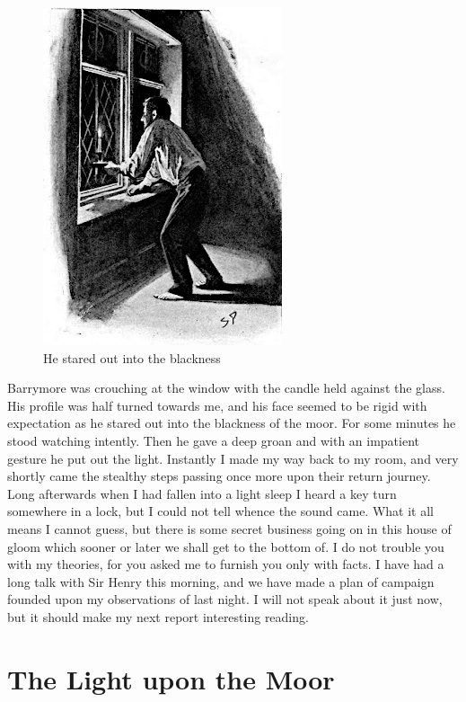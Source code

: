 \documentclass[paper=5.5in:8.5in,BCOR=7mm,twoside,DIV=calc,12pt,usegeometry,openany,chapterprefix,endperiod]{scrbook} %
\begin{document}
\begin{figure}
\centering
\includegraphics[width=.7\linewidth]{08_candle}
\caption{He stared out into the blackness}
\end{figure}


Barrymore was crouching at the window with the candle held against the glass. His profile was half turned towards me, and his face seemed to be rigid with expectation as he stared out into the blackness of the moor. For some minutes he stood watching intently. Then he gave a deep groan and with an impatient gesture he put out the light. Instantly I made my way back to my room, and very shortly came the stealthy steps passing once more upon their return journey. Long afterwards when I had fallen into a light sleep I heard a key turn somewhere in a lock, but I could not tell whence the sound came. What it all means I cannot guess, but there is some secret business going on in this house of gloom which sooner or later we shall get to the bottom of. I do not trouble you with my theories, for you asked me to furnish you only with facts. I have had a long talk with Sir Henry this morning, and we have made a plan of campaign founded upon my observations of last night. I will not speak about it just now, but it should make my next report interesting reading.

\chapter{The Light upon the Moor}
\end{document}
